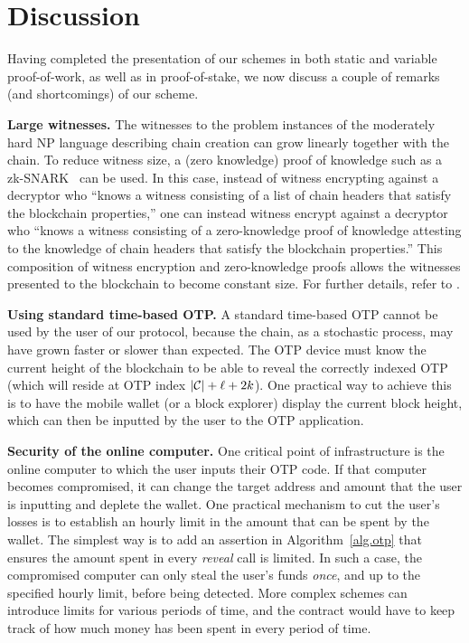 \section{Discussion}

Having completed the presentation of our schemes in both static and variable proof-of-work,
as well as in proof-of-stake, we now discuss a couple of
remarks (and shortcomings) of our scheme.

\noindent
\textbf{Large witnesses.}
The witnesses to the problem instances of the moderately hard \textsc{NP} language describing
chain creation can grow linearly together with the chain. To reduce witness
size, a (zero knowledge) proof of knowledge such as a zk-SNARK~\cite{EPRINT:BCTV13} can be used.
In this case, instead of
witness encrypting against a decryptor who
``knows a witness consisting of a list of chain headers that satisfy the blockchain properties,''
one can instead witness encrypt against a decryptor who
``knows a witness consisting of a zero-knowledge proof of knowledge attesting to the knowledge of chain headers
that satisfy the blockchain properties.'' This composition of witness encryption and zero-knowledge proofs
allows the witnesses presented to the blockchain to become constant size. For further details,
refer to \cite{timelock-bitcoin}.

\noindent
\textbf{Using standard time-based OTP.}
A standard time-based OTP cannot be used by the user of our protocol, because the
chain, as a stochastic process, may have grown faster or slower than expected. The
OTP device must know the current height of the blockchain to be able to reveal the
correctly indexed OTP (which will reside at OTP index $|\mathcal{C}| + \ell + 2k$).
One practical way to achieve this is to have the mobile
wallet (or a block explorer) display the current block height, which can then be
inputted by the user to the OTP application.

\noindent
\textbf{Security of the online computer.}
One critical point of infrastructure is the online
computer to which the user inputs their OTP code. If that computer becomes
compromised, it can change the target address and amount that the user is
inputting and deplete the wallet. One practical mechanism to cut the user's losses
is to establish an hourly limit in the amount that can be spent by the wallet.
The simplest way is to add an assertion in Algorithm~\ref{alg.otp} that ensures
the amount spent in every \emph{reveal} call is limited. In
such a case, the compromised computer can only steal the user's funds \emph{once},
and up to the specified hourly limit, before being detected.
More complex schemes can introduce limits for various periods of time,
and the contract would have to keep track of how much money has been spent
in every period of time.


